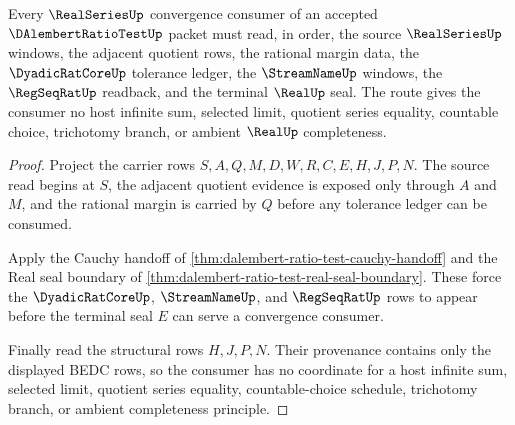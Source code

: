 \begin{theorem}
\label{thm:dalembert-ratio-test-real-series-route}
Every $\RealSeriesUp$ convergence consumer of an accepted $\DAlembertRatioTestUp$
packet must read, in order, the source $\RealSeriesUp$ windows, the adjacent
quotient rows, the rational margin data, the $\DyadicRatCoreUp$ tolerance
ledger, the $\StreamNameUp$ windows, the $\RegSeqRatUp$ readback, and the
terminal $\RealUp$ seal. The route gives the consumer no host infinite sum,
selected limit, quotient series equality, countable choice, trichotomy branch,
or ambient $\RealUp$ completeness.
\end{theorem}
\begin{proof}
Project the carrier rows $S,A,Q,M,D,W,R,C,E,H,J,P,N$. The source read begins at
$S$, the adjacent quotient evidence is exposed only through $A$ and $M$, and the
rational margin is carried by $Q$ before any tolerance ledger can be consumed.

Apply the Cauchy handoff of \autoref{thm:dalembert-ratio-test-cauchy-handoff}
and the Real seal boundary of
\autoref{thm:dalembert-ratio-test-real-seal-boundary}. These force the
$\DyadicRatCoreUp$, $\StreamNameUp$, and $\RegSeqRatUp$ rows to appear before
the terminal seal $E$ can serve a convergence consumer.

Finally read the structural rows $H,J,P,N$. Their provenance contains only the
displayed BEDC rows, so the consumer has no coordinate for a host infinite sum,
selected limit, quotient series equality, countable-choice schedule,
trichotomy branch, or ambient completeness principle.
\end{proof}




